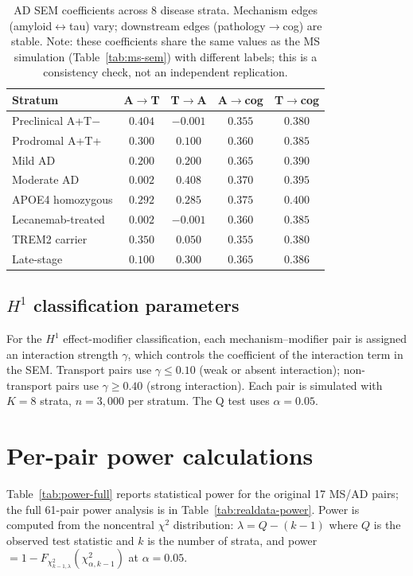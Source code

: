 \documentclass[11pt]{article}
\begin{document}
\begin{table}[h]
\centering
\caption{AD SEM coefficients across 8 disease strata. Mechanism edges (amyloid$\leftrightarrow$tau) vary; downstream edges (pathology$\to$cog) are stable. Note: these coefficients share the same values as the MS simulation (Table~\ref{tab:ms-sem}) with different labels; this is a consistency check, not an independent replication.}
\label{tab:ad-sem}
\small
\begin{tabular}{@{}lcccc@{}}
\toprule
\textbf{Stratum} & \textbf{A$\to$T} & \textbf{T$\to$A} & \textbf{A$\to$cog} & \textbf{T$\to$cog} \\
\midrule
Preclinical A+T$-$ & $0.404$ & $-0.001$ & $0.355$ & $0.380$ \\
Prodromal A+T+ & $0.300$ & $0.100$ & $0.360$ & $0.385$ \\
Mild AD & $0.200$ & $0.200$ & $0.365$ & $0.390$ \\
Moderate AD & $0.002$ & $0.408$ & $0.370$ & $0.395$ \\
APOE4 homozygous & $0.292$ & $0.285$ & $0.375$ & $0.400$ \\
Lecanemab-treated & $0.002$ & $-0.001$ & $0.360$ & $0.385$ \\
TREM2 carrier & $0.350$ & $0.050$ & $0.355$ & $0.380$ \\
Late-stage & $0.100$ & $0.300$ & $0.365$ & $0.386$ \\
\bottomrule
\end{tabular}
\end{table}

\subsection{$H^1$ classification parameters}

For the $H^1$ effect-modifier classification, each mechanism--modifier pair is assigned an interaction strength $\gamma$, which controls the coefficient of the interaction term in the SEM. Transport pairs use $\gamma \leq 0.10$ (weak or absent interaction); non-transport pairs use $\gamma \geq 0.40$ (strong interaction). Each pair is simulated with $K = 8$ strata, $n = 3{,}000$ per stratum. The Q test uses $\alpha = 0.05$.

\section{Per-pair power calculations}
\label{app:power}

Table~\ref{tab:power-full} reports statistical power for the original 17 MS/AD pairs; the full 61-pair power analysis is in Table~\ref{tab:realdata-power}. Power is computed from the noncentral $\chi^2$ distribution: $\lambda = Q - (k-1)$ where $Q$ is the observed test statistic and $k$ is the number of strata, and power $= 1 - F_{\chi^2_{k-1,\lambda}}(\chi^2_{\alpha, k-1})$ at $\alpha = 0.05$.
\end{document}
